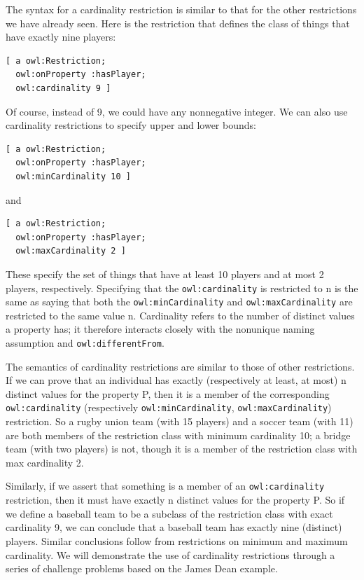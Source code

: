 The syntax for a cardinality restriction is similar to that for the
other restrictions we have already
seen. Here is the restriction that defines the class of things that have
exactly nine players:

\begin{lstlisting}
[ a owl:Restriction;
  owl:onProperty :hasPlayer;
  owl:cardinality 9 ]
\end{lstlisting}

Of course, instead of 9, we could have any nonnegative integer. We can
also use cardinality restrictions to specify upper and lower bounds:

\begin{lstlisting}
[ a owl:Restriction;
  owl:onProperty :hasPlayer;
  owl:minCardinality 10 ]
\end{lstlisting}

and

\begin{lstlisting}
[ a owl:Restriction;
  owl:onProperty :hasPlayer;
  owl:maxCardinality 2 ]
\end{lstlisting}

These specify the set of things that have at least 10 players and at
most 2 players, respectively. Specifying that the \texttt{owl:cardinality} is
restricted to n is the same as saying that both the \texttt{owl:minCardinality}
and \texttt{owl:maxCardinality} are restricted to the same value n. Cardinality
refers to the number of distinct values a property has; it therefore
interacts closely with the nonunique naming assumption and
\texttt{owl:differentFrom}.

The semantics of cardinality restrictions are similar to those of other
restrictions. If we can prove that
an individual has exactly (respectively at least, at most) n distinct
values for the property P, then it is a member of the corresponding
\texttt{owl:cardinality} (respectively \texttt{owl:minCardinality}, \texttt{owl:maxCardinality})
restriction. So a rugby union team (with 15 players) and a soccer team
(with 11) are both members of the restriction class with minimum
cardinality 10; a bridge team (with two players) is not, though it is a
member of the restriction class with max cardinality 2.

Similarly, if we assert that something is a member of an \texttt{owl:cardinality}
restriction, then it must have exactly n distinct values for the
property P. So if we define a baseball team to be a subclass of the
restriction class with exact cardinality 9, we can conclude that a
baseball team has exactly nine (distinct) players. Similar conclusions
follow from restrictions on minimum and maximum cardinality. We will
demonstrate the use of cardinality restrictions through a series of
challenge problems based on the James Dean example.


